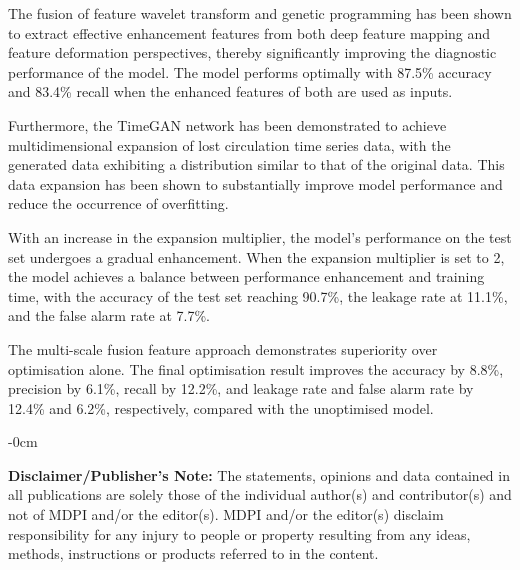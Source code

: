 \documentclass[journal,article,submit,pdftex,moreauthors]{Definitions/mdpi}
\begin{document}
The fusion of feature wavelet transform and genetic programming has been shown to extract effective enhancement features from both deep feature mapping and feature deformation perspectives, thereby significantly improving the diagnostic performance of the model. The model performs optimally with 87.5\% accuracy and 83.4\% recall when the enhanced features of both are used as inputs.

Furthermore, the TimeGAN network has been demonstrated to achieve multidimensional expansion of lost circulation time series data, with the generated data exhibiting a distribution similar to that of the original data. This data expansion has been shown to substantially improve model performance and reduce the occurrence of overfitting. 

With an increase in the expansion multiplier, the model's performance on the test set undergoes a gradual enhancement. When the expansion multiplier is set to 2, the model achieves a balance between performance enhancement and training time, with the accuracy of the test set reaching 90.7\%, the leakage rate at 11.1\%, and the false alarm rate at 7.7\%.

The multi-scale fusion feature approach demonstrates superiority over optimisation alone. The final optimisation result improves the accuracy by 8.8\%, precision by 6.1\%, recall by 12.2\%, and leakage rate and false alarm rate by 12.4\% and 6.2\%, respectively, compared with the unoptimised model.




\begin{adjustwidth}{-\extralength}{0cm}





\vspace{20pt} 

\noindent \textbf{Disclaimer/Publisher's Note:} The statements, opinions and data contained in all publications are solely those of the individual author(s) and contributor(s) and not of MDPI and/or the editor(s). MDPI and/or the editor(s) disclaim responsibility for any injury to people or property resulting from any ideas, methods, instructions or products referred to in the content.


\end{adjustwidth}




\end{document}

